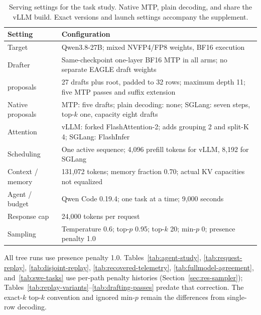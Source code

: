 \begin{table}[!htbp]
\caption{Serving settings for the task study. Native MTP, plain decoding, and \sys{} share the vLLM build. Exact versions and launch settings accompany the supplement.}
\label{tab:serving-config}
\centering\footnotesize
\renewcommand{\arraystretch}{1.12}
\begin{tabularx}{\columnwidth}{@{}>{\raggedright\arraybackslash}p{}Y@{}}
\toprule
Setting & Configuration \\
\midrule
Target & Qwen3.8-27B; mixed NVFP4/FP8 weights, BF16 execution \\
Drafter & Same-checkpoint one-layer BF16 MTP in all arms; no separate EAGLE draft weights \\
\sys{} proposals & 27 drafts plus root, padded to 32 rows; maximum depth 11; five MTP passes and suffix extension \\
Native proposals & MTP: five drafts; plain decoding: none; SGLang: seven steps, top-$k$ one, capacity eight drafts \\
Attention & vLLM: forked FlashAttention-2; \sys{} adds grouping 2 and split-K 4; SGLang: FlashInfer \\
Scheduling & One active sequence; 4,096 prefill tokens for vLLM, 8,192 for SGLang \\
Context / memory & 131,072 tokens; memory fraction 0.70; actual KV capacities not equalized \\
Agent / budget & Qwen Code 0.19.4; one task at a time; 9,000 seconds \\
Response cap & 24,000 tokens per request \\
Sampling & Temperature 0.6; top-$p$ 0.95; top-$k$ 20; min-$p$ 0; presence penalty 1.0 \\
\bottomrule
\end{tabularx}
\end{table}

All tree runs use presence penalty 1.0. Tables~\ref{tab:agent-study}, \ref{tab:request-replay}, \ref{tab:disjoint-replay}, \ref{tab:recovered-telemetry}, \ref{tab:fullmodel-agreement}, and~\ref{tab:swe-tasks} use per-path penalty histories (Section~\ref{sec:res-sampler}); Tables~\ref{tab:replay-variants}--\ref{tab:drafting-passes} predate that correction. The exact-$k$ top-$k$ convention and ignored min-$p$ remain the differences from single-row decoding.
